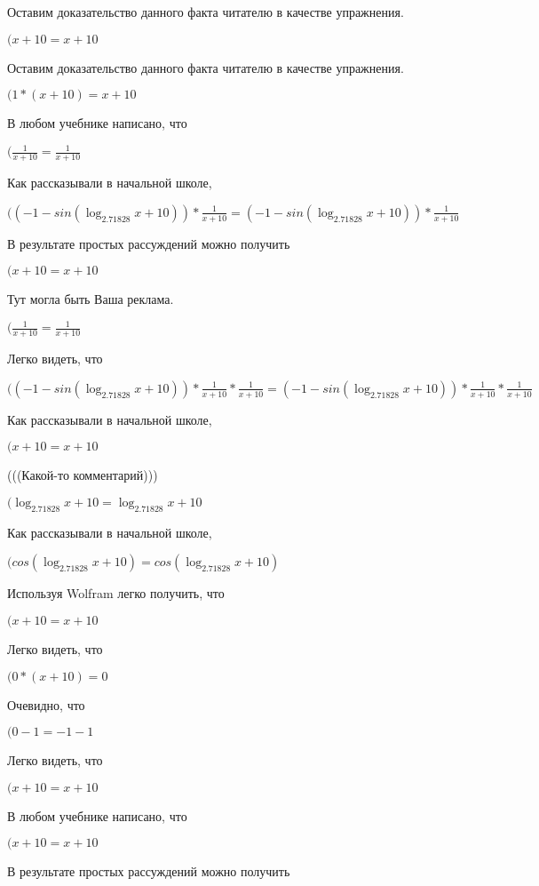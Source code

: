 \documentclass[12pt,a4paper,fleqn]{article}
\theoremstyle{definition}
\begin{document}
Оставим доказательство данного факта читателю в качестве упражнения.

$( x  +  10  =  x  +  10 $

Оставим доказательство данного факта читателю в качестве упражнения.

$( 1  * ( x  +  10 ) =  x  +  10 $

В любом учебнике написано, что

$(\frac{ 1 }{ x  +  10 }
 = \frac{ 1 }{ x  +  10 }
$

Как рассказывали в начальной школе,

$(( -1  - sin(\log_{ 2.71828 }{ x  +  10 })) * \frac{ 1 }{ x  +  10 }
 = ( -1  - sin(\log_{ 2.71828 }{ x  +  10 })) * \frac{ 1 }{ x  +  10 }
$

В результате простых рассуждений можно получить

$( x  +  10  =  x  +  10 $

Тут могла быть Ваша реклама.

$(\frac{ 1 }{ x  +  10 }
 = \frac{ 1 }{ x  +  10 }
$

Легко видеть, что

$(( -1  - sin(\log_{ 2.71828 }{ x  +  10 })) * \frac{ 1 }{ x  +  10 }
 * \frac{ 1 }{ x  +  10 }
 = ( -1  - sin(\log_{ 2.71828 }{ x  +  10 })) * \frac{ 1 }{ x  +  10 }
 * \frac{ 1 }{ x  +  10 }
$

Как рассказывали в начальной школе,

$( x  +  10  =  x  +  10 $

(((Какой-то комментарий)))

$(\log_{ 2.71828 }{ x  +  10 } = \log_{ 2.71828 }{ x  +  10 }$

Как рассказывали в начальной школе,

$(cos(\log_{ 2.71828 }{ x  +  10 }) = cos(\log_{ 2.71828 }{ x  +  10 })$

Используя Wolfram легко получить, что

$( x  +  10  =  x  +  10 $

Легко видеть, что

$( 0  * ( x  +  10 ) =  0 $

Очевидно, что

$( 0  -  1  =  -1  -  1 $

Легко видеть, что

$( x  +  10  =  x  +  10 $

В любом учебнике написано, что

$( x  +  10  =  x  +  10 $

В результате простых рассуждений можно получить
\end{document}

